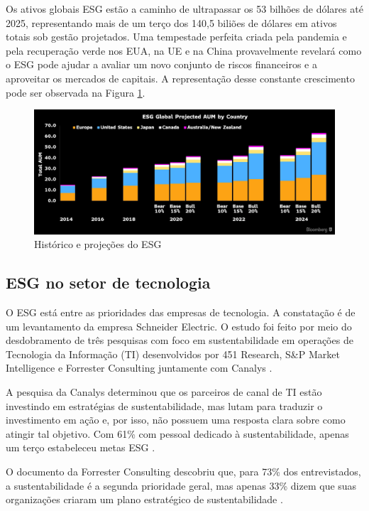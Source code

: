 \documentclass[12pt]{article}
\begin{document}
	
	Os ativos globais ESG estão a caminho de ultrapassar os 53 bilhões de dólares até 2025, representando mais de um terço dos 140,5 biliões de dólares em ativos totais sob gestão projetados. Uma tempestade perfeita criada pela pandemia e pela recuperação verde nos EUA, na UE e na China provavelmente revelará como o ESG pode ajudar a avaliar um novo conjunto de riscos financeiros e a aproveitar os mercados de capitais. A representação desse constante crescimento pode ser observada na Figura \ref{fig:projections}.
	
	\begin{figure}[h]
		\centering
		\includegraphics[scale=0.2]{pictures/esg-projections.png}
		\caption{Histórico e projeções do ESG}
		\label{fig:projections}
	\end{figure}
	
	\subsection*{ESG no setor de tecnologia}
	
	O ESG está entre as prioridades das empresas de tecnologia. A constatação é de um levantamento da empresa Schneider Electric. O estudo foi feito por meio do desdobramento de três pesquisas com foco em sustentabilidade em operações de Tecnologia da Informação (TI) desenvolvidos por 451 Research, S\&P Market Intelligence e Forrester Consulting juntamente com Canalys \cite{paceteESGPrioridadePara2022}.
	
	A pesquisa da Canalys determinou que os parceiros de canal de TI estão investindo em estratégias de sustentabilidade, mas lutam para traduzir o investimento em ação e, por isso, não possuem uma resposta clara sobre como atingir tal objetivo. Com 61\% com pessoal dedicado à sustentabilidade, apenas um terço estabeleceu metas ESG \cite{paceteESGPrioridadePara2022}.
	
	O documento da Forrester Consulting descobriu que, para 73\% dos entrevistados, a sustentabilidade é a segunda prioridade geral, mas apenas 33\% dizem que suas organizações criaram um plano estratégico de sustentabilidade \cite{paceteESGPrioridadePara2022}.
	
\end{document}
